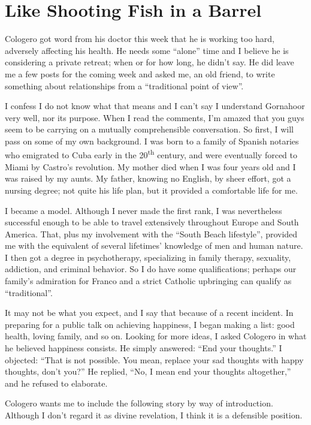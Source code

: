 \section{Like Shooting Fish in a Barrel}

Cologero got word from his doctor this week that he is working too hard, adversely affecting his health. He needs some ``alone'' time and I believe he is considering a private retreat; when or for how long, he didn't say. He did leave me a few posts for the coming week and asked me, an old friend, to write something about relationships from a ``traditional point of view''.

I confess I do not know what that means and I can't say I understand Gornahoor very well, nor its purpose. When I read the comments, I'm amazed that you guys seem to be carrying on a mutually comprehensible conversation. So first, I will pass on some of my own background. I was born to a family of Spanish notaries who emigrated to Cuba early in the 20\textsuperscript{th} century, and were eventually forced to Miami by Castro's revolution. My mother died when I was four years old and I was raised by my aunts. My father, knowing no English, by sheer effort, got a nursing degree; not quite his life plan, but it provided a comfortable life for me.

I became a model. Although I never made the first rank, I was nevertheless successful enough to be able to travel extensively throughout Europe and South America. That, plus my involvement with the ``South Beach lifestyle'', provided me with the equivalent of several lifetimes' knowledge of men and human nature. I then got a degree in psychotherapy, specializing in family therapy, sexuality, addiction, and criminal behavior. So I do have some qualifications; perhaps our family's admiration for Franco and a strict Catholic upbringing can qualify as ``traditional''.

It may not be what you expect, and I say that because of a recent incident. In preparing for a public talk on achieving happiness, I began making a list: good health, loving family, and so on. Looking for more ideas, I asked Cologero in what he believed happiness consists. He simply answered: ``End your thoughts.'' I objected: ``That is not possible. You mean, replace your sad thoughts with happy thoughts, don't you?'' He replied, ``No, I mean end your thoughts altogether,'' and he refused to elaborate.

Cologero wants me to include the following story by way of introduction. Although I don't regard it as divine revelation, I think it is a defensible position.

